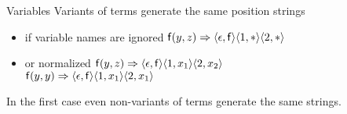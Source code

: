 

	
	\begin{block}{Variables}
		Variants of terms generate the same position strings
		\pause
		\begin{itemize}
			\item if variable names are ignored 
			\hfill${\mathsf f}(y,z) \Rightarrow
			\langle\epsilon,{\mathsf f}\rangle
			\langle1,*\rangle
			\langle2,*\rangle
			$
			\pause
			\item or normalized 
			\hfill${\mathsf f}(y,z) \Rightarrow
				\langle\epsilon,{\mathsf f}\rangle
				\langle1,x_1\rangle
				\langle2,x_2\rangle$
			\pause\\
			\hfill${\mathsf f}(y,y) \Rightarrow
			\langle\epsilon,{\mathsf f}\rangle
			\langle1,x_1\rangle
			\langle2,x_1\rangle
			$
		\end{itemize}
		\pause
		In the first case even non-variants of terms generate the same strings.
\end{block}
\pause